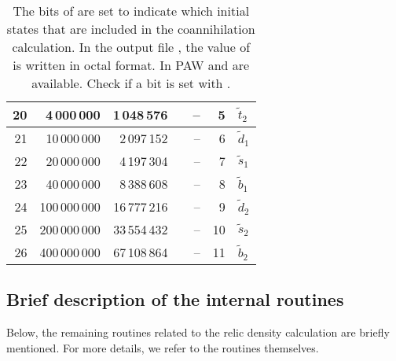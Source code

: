 \begin{table}[!h]
\begin{tabular}{rrrcrrl}
20 &   4\,000\,000 &  1\,048\,576 &&  -- &   5 & $\tilde{t}_2$ \\ \hline
21 &  10\,000\,000 &  2\,097\,152 &&  -- &   6 & $\tilde{d}_1$ \\
22 &  20\,000\,000 &  4\,197\,304 &&  -- &   7 & $\tilde{s}_1$ \\
23 &  40\,000\,000 &  8\,388\,608 &&  -- &   8 & $\tilde{b}_1$ \\
24 & 100\,000\,000 & 16\,777\,216 &&  -- &   9 & $\tilde{d}_2$ \\
25 & 200\,000\,000 & 33\,554\,432 &&  -- &  10 & $\tilde{s}_2$ \\
26 & 400\,000\,000 & 67\,108\,864 &&  -- &  11 & $\tilde{b}_2$ \\ \hline
\end{tabular}
\caption{The bits of  are set to indicate which initial states that
are included in the coannihilation calculation. In the output file , the value of  is written in octal format. In PAW  and  are available. Check if a bit is set with .}
\label{tab:copart}
\end{table}

\subsection{Brief description of the internal routines}

Below, the remaining routines related to the relic density calculation
are briefly mentioned. For more details, we refer to the routines
themselves.

